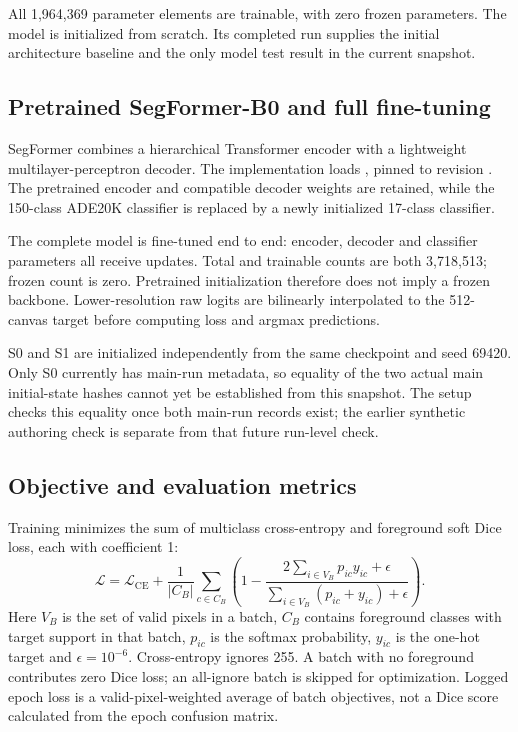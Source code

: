 \documentclass[oneside,final,a4 paper]{hcmut-report}
\begin{document}
All 1,964,369 parameter elements are trainable, with zero frozen parameters. The model is initialized from scratch. Its completed run supplies the initial architecture baseline and the only model test result in the current snapshot.

\subsection{Pretrained SegFormer-B0 and full fine-tuning}
SegFormer combines a hierarchical Transformer encoder with a lightweight multilayer-perceptron decoder\cite{segformer}. The implementation loads , pinned to revision . The pretrained encoder and compatible decoder weights are retained, while the 150-class ADE20K classifier is replaced by a newly initialized 17-class classifier.

The complete model is fine-tuned end to end: encoder, decoder and classifier parameters all receive updates. Total and trainable counts are both 3,718,513; frozen count is zero. Pretrained initialization therefore does not imply a frozen backbone. Lower-resolution raw logits are bilinearly interpolated to the 512-canvas target before computing loss and argmax predictions.

S0 and S1 are initialized independently from the same checkpoint and seed 69420. Only S0 currently has main-run metadata, so equality of the two actual main initial-state hashes cannot yet be established from this snapshot. The setup checks this equality once both main-run records exist; the earlier synthetic authoring check is separate from that future run-level check.

\subsection{Objective and evaluation metrics}
Training minimizes the sum of multiclass cross-entropy and foreground soft Dice loss, each with coefficient 1:
\begin{equation}
\mathcal L=\mathcal L_{\mathrm{CE}}+\frac{1}{|C_B|}\sum_{c\in C_B}\left(1-\frac{2\sum_{i\in V_B}p_{ic}y_{ic}+\epsilon}{\sum_{i\in V_B}(p_{ic}+y_{ic})+\epsilon}\right).
\end{equation}
Here $V_B$ is the set of valid pixels in a batch, $C_B$ contains foreground classes with target support in that batch, $p_{ic}$ is the softmax probability, $y_{ic}$ is the one-hot target and $\epsilon=10^{-6}$. Cross-entropy ignores 255. A batch with no foreground contributes zero Dice loss; an all-ignore batch is skipped for optimization. Logged epoch loss is a valid-pixel-weighted average of batch objectives, not a Dice score calculated from the epoch confusion matrix.
\end{document}
